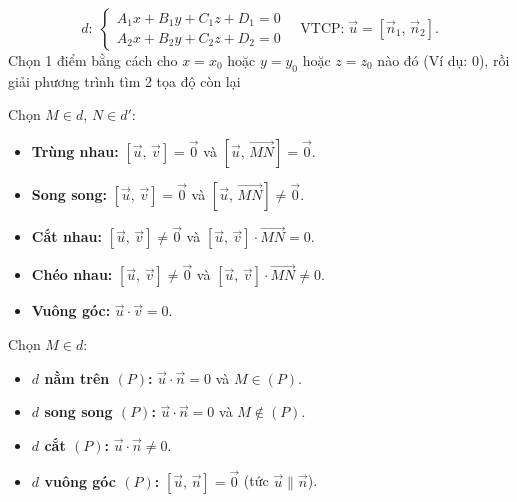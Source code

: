 \documentclass[12pt,a4paper]{article}
\begin{document}
\begin{congthuc}[title={Đường thẳng là giao tuyến của hai mặt phẳng}]
  \[
    d\!:\;
    \begin{cases}
      A_1 x + B_1 y + C_1 z + D_1 = 0 \\
      A_2 x + B_2 y + C_2 z + D_2 = 0
    \end{cases}
    \quad\text{VTCP:}\; \vec{u} = [\vec{n}_1,\, \vec{n}_2].
  \]
  Chọn 1 điểm bằng cách cho $x = x_0$ hoặc $y = y_0$ hoặc $z = z_0$ nào đó (Ví dụ: $0$), rồi giải phương trình tìm 2 tọa độ còn lại
\end{congthuc}

\begin{congthuc}[title={Vị trí tương đối giữa hai đường thẳng $d(\vec{u})$ và $d'(\vec{v})$}]
  Chọn $M \in d$, $N \in d'$:
  \begin{itemize}
    \item \textbf{Trùng nhau:}
      $[\vec{u},\, \vec{v}] = \vec{0}$ và $[\vec{u},\, \overrightarrow{MN}] = \vec{0}$.
    \item \textbf{Song song:}
      $[\vec{u},\, \vec{v}] = \vec{0}$ và $[\vec{u},\, \overrightarrow{MN}] \ne \vec{0}$.
    \item \textbf{Cắt nhau:}
      $[\vec{u},\, \vec{v}] \ne \vec{0}$ và $[\vec{u},\, \vec{v}] \cdot \overrightarrow{MN} = 0$.
    \item \textbf{Chéo nhau:}
      $[\vec{u},\, \vec{v}] \ne \vec{0}$ và $[\vec{u},\, \vec{v}] \cdot \overrightarrow{MN} \ne 0$.
    \item \textbf{Vuông góc:}
      $\vec{u} \cdot \vec{v} = 0$.
  \end{itemize}
\end{congthuc}

\begin{congthuc}[title={Vị trí tương đối giữa đường thẳng $d(\vec{u})$ và mặt phẳng $(P)(\vec{n})$}]
  Chọn $M \in d$:
  \begin{itemize}
    \item \textbf{$d$ nằm trên $(P)$:}
      $\vec{u} \cdot \vec{n} = 0$ và $M \in (P)$.
    \item \textbf{$d$ song song $(P)$:}
      $\vec{u} \cdot \vec{n} = 0$ và $M \notin (P)$.
    \item \textbf{$d$ cắt $(P)$:}
      $\vec{u} \cdot \vec{n} \ne 0$.
    \item \textbf{$d$ vuông góc $(P)$:}
      $[\vec{u},\, \vec{n}] = \vec{0}$ \;(tức $\vec{u} \parallel \vec{n}$).
  \end{itemize}
\end{congthuc}
\end{document}
